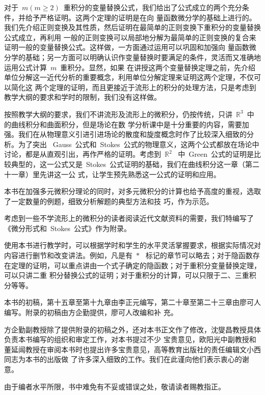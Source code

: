 \begin{preface}
对于~$m(m\geqslant2)$~重积分的变量替换公式，我们给出了公式成立的两个充分条件，并给予严格证明。这两个定理的证明是在向
量函数微分学的基础上进行的。我们先介绍正则变换及其性质，然后证明在最简单的正则变换下重积分的变量替换公式成立，再利用
一般的正则变换可以局部地分解为最简单的正则变换的复合来证明一般的变量替换公式。这样做，一方面通过运用可以巩固和加强向
量函数微分学的基础；另一方面可以明确认识作变量替换时要满足的条件，灵活而又准确地运用公式计算~$m$~重积分。显然，如果
在讲授这两个变量替换定理之前，先介绍单位分解这一近代分析的重要概念，利用单位分解定理来证明这两个定理，不仅可以简化这
两个定理的证明，而且更接近于流形上的积分的处理方法，只是考虑到教学大纲的要求和学时的限制，我们没有这样做。

按照教学大纲的要求，我们不讲流形及流形上的微积分，仍按传统，只讲~$\mathbb R^3$~中的曲线积分和曲面积分，但是场论在数
学分析课中是十分重要的内容，需要加强。我们在从物理意义引进引进场论的散度和旋度概念时作了比较深入细致的分析。为了突出
~Gauss~公式和~Stokes~公式的物理意义，这两个公式都放在场论中讨论，都是从直观引出，再作严格的证明。考虑到~$\mathbb R^2$~
中~Green~公式的证明是比较典型的，这一公式又是~Stokes~公式证明的基础，我们在曲线积分这一章（第二十一章）里先讲这一公
式，让学生预先熟悉这一公式的证明和应用。

本书在加强多元微积分理论的同时，对多元微积分的计算也给予高度的重视，选取了一定数量的例题，细致分析解题的典型方法和技
巧，作为示范。

考虑到一些不学流形上的微积分的读者阅读近代文献资料的需要，我们特编写了《微分形式和~Stokes~公式》作为附录。

使用本书进行教学时，可以根据学时和学生的水平灵活掌握要求，根据实际情况对内容进行删节和改变讲法。例如，凡是有~$\ast$~
标记的章节可以略去；对于隐函数存在定理的证明，可以重点讲由一个式子确定的隐函数；对于重积分变量替换定理，可以只讲二重
积分替换公式的证明；对于重积分的计算，可以只限于二、三重积分等等。

本书的初稿，第十五章至第十九章由李正元编写，第二十章至第二十三章由廖可人编写。附录的初稿由方企勤提供，廖可人改编和补
充。

方企勤副教授除了提供附录的初稿之外，还对本书正文作了修改，沈燮昌教授具体负责本书编写的组织和审定工作，对本书提过不少
宝贵意见，欧阳光中副教授和董延闿教授在审阅本书时也提出许多宝贵意见，高等教育出版社的责任编辑文小西同志为本书的出版做
了许多深入细致的工作。我们在此谨向他们表示衷心的谢意。

由于编者水平所限，书中难免有不妥或错误之处，敬请读者赐教指正。
\end{preface}

\endinput
